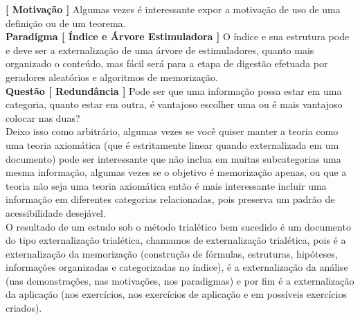 \documentclass[10pt,a4paper]{report}
\begin{document}
\textbf{[ Motivação ]} Algumas vezes é interessante expor a motivação de uso de uma definição ou de um teorema.\\

\textbf{Paradigma [ Índice e Árvore Estimuladora ]} O índice e sua estrutura pode e deve ser a externalização de uma árvore de estimuladores, quanto mais organizado o conteúdo, mas fácil será para a etapa de digestão efetuada por geradores aleatórios e algoritmos de memorização.\\

\textbf{Questão [ Redundância ]} Pode ser que uma informação possa estar em uma categoria, quanto estar em outra, é vantajoso escolher uma ou é mais vantajoso colocar nas duas? \\

Deixo isso como arbitrário, algumas vezes se você quiser manter a teoria como uma teoria axiomática (que é estritamente linear quando externalizada em um documento) pode ser interessante que não inclua em muitas subcategorias uma mesma informação, algumas vezes se o objetivo é memorização apenas, ou que a teoria não seja uma teoria axiomática então é mais interessante incluir uma informação em diferentes categorias relacionadas, pois preserva um padrão de acessibilidade desejável.\\

O resultado de um estudo sob o método trialético bem sucedido é um documento do tipo externalização trialética, chamamos de externalização trialética, pois é a externalização da memorização (construção de fórmulas, estruturas, hipóteses, informações organizadas e categorizadas no índice), é a externalização da análise (nas demonstrações, nas motivações, nos paradigmas) e por fim é a externalização da aplicação (nos exercícios, nos exercícios de aplicação e em possíveis exercícios criados).


\end{document}
